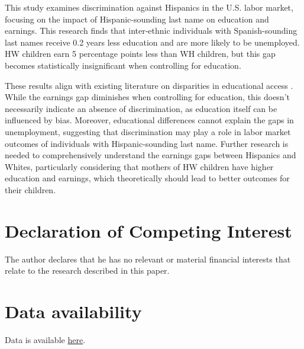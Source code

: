 \documentclass[a4paper,fleqn]{cas-sc}
\begin{document}
This study examines discrimination against Hispanics in the U.S. labor market, focusing on the impact of Hispanic-sounding last name on education and earnings. This research finds that inter-ethnic individuals with Spanish-sounding last names receive 0.2 years less education and are more likely to be unemployed. HW children earn 5 percentage points less than WH children, but this gap becomes statistically insignificant when controlling for education.

These results align with existing literature on disparities in educational access \citep{bergman2018education,gaddis2024racial}. While the earnings gap diminishes when controlling for education, this doesn't necessarily indicate an absence of discrimination, as education itself can be influenced by bias. Moreover, educational differences cannot explain the gaps in unemployment, suggesting that discrimination may play a role in labor market outcomes of individuals with Hispanic-sounding last name. Further research is needed to comprehensively understand the earnings gaps between Hispanics and Whites, particularly considering that mothers of HW children have higher education and earnings, which theoretically should lead to better outcomes for their children.


\section*{Declaration of Competing Interest}
The author declares that he has no relevant or material financial interests that relate to the research described in this paper.

\section*{Data availability}

Data is available \href{https://github.com/hhadah/hispanic-last-names/tree/main/data/datasets}{here}.

\newpage
\clearpage



\newpage
\clearpage


\newpage
\clearpage



\newpage
\clearpage



\newpage
\clearpage


\end{document}
